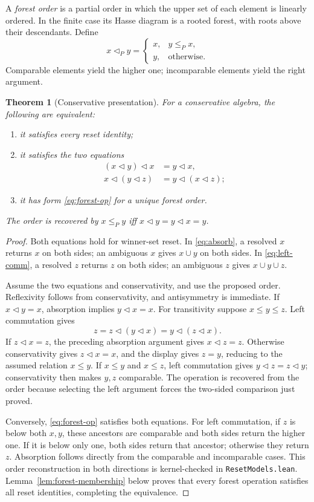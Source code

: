\documentclass[11pt]{article}
\newtheorem{theorem}{Theorem}[section]
\newcommand{\del}{\mathbin{\triangleleft}}
\begin{document}
A \emph{forest order} is a partial order in which the upper set of each
element is linearly ordered. In the finite case its Hasse diagram is a
rooted forest, with roots above their descendants. Define
\begin{equation}\label{eq:forest-op}
 x\del_P y=\begin{cases}x,&y\leq_P x,\\y,&\text{otherwise}.\end{cases}
\end{equation}
Comparable elements yield the higher one; incomparable elements yield
the right argument.

\begin{theorem}[Conservative presentation]\label{thm:forest}
For a conservative algebra, the following are equivalent:
\begin{enumerate}
\item it satisfies every reset identity;
\item it satisfies the two equations
\begin{align}
 (x\del y)\del x&=y\del x,\label{eq:absorb}\\
 x\del(y\del z)&=y\del(x\del z);\label{eq:left-comm}
\end{align}
\item it has form \eqref{eq:forest-op} for a unique forest order.
\end{enumerate}
The order is recovered by
$x\leq_P y$ iff $x\del y=y\del x=y$.
\end{theorem}
\begin{proof}
Both equations hold for winner-set reset. In
\eqref{eq:absorb}, a resolved $x$ returns $x$ on both sides; an
ambiguous $x$ gives $x\cup y$ on both sides.
In \eqref{eq:left-comm}, a resolved $z$ returns $z$ on both sides;
an ambiguous $z$ gives $x\cup y\cup z$.

Assume the two equations and conservativity, and use the proposed
order. Reflexivity follows from conservativity, and antisymmetry is
immediate. If $x\del y=x$, absorption implies $y\del x=x$.
For transitivity suppose $x\leq y\leq z$. Left commutation gives
\[
 z=z\del(y\del x)=y\del(z\del x).
\]
If $z\del x=z$, the preceding absorption argument gives $x\del z=z$.
Otherwise conservativity gives $z\del x=x$, and the display gives
$z=y$, reducing to the assumed relation $x\leq y$.
If $x\leq y$ and $x\leq z$, left commutation gives
$y\del z=z\del y$; conservativity then makes $y,z$ comparable.
The operation is recovered from the order because selecting the left
argument forces the two-sided comparison just proved.

Conversely, \eqref{eq:forest-op} satisfies both equations.
For left commutation, if $z$ is below both $x,y$, these ancestors
are comparable and both sides return the higher one. If it is below
only one, both sides return that ancestor; otherwise they return $z$.
Absorption follows directly from the comparable and incomparable cases.
This order reconstruction in both directions is kernel-checked in
\texttt{ResetModels.lean}. Lemma~\ref{lem:forest-membership} below proves
that every forest operation satisfies all reset identities, completing
the equivalence.
\end{proof}
\end{document}

